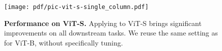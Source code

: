 \begin{figure}[htbp]
\centering
\texttt{[image: pdf/pic-vit-s-single\_column.pdf]}
\caption{\textbf{Performance on ViT-S.} Applying \ourmethod to ViT-S brings significant improvements on all downstream tasks. We reuse the same setting as for ViT-B, without specifically tuning.}
\label{fig:vit-s}
\end{figure}